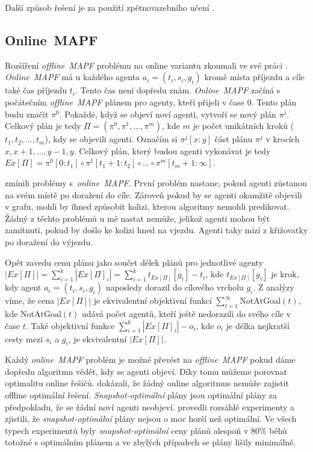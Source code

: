 Další způsob řešení je za použití zpětnovazebního učení \citep*{Zhiyao}.

\subsection{Online~MAPF}\label{subsec:online_mapf}

Rozšíření \emph{offline~MAPF} problému na online variantu zkoumali ve své práci \citet*{Svancara}.
\emph{Online~MAPF} má u každého agenta $a_i = (t_i, s_i, g_i)$ kromě místa příjezdu a cíle také čas příjezdu $t_i$.
Tento čas není dopředu znám.
\emph{Online~MAPF} začíná s počátečním \emph{offline~MAPF} plánem pro agenty, kteří přijeli v čase $0$.
Tento plán budu značit $\pi^0$.
Pokaždé, když se objeví noví agenti, vytvoří se nový plán $\pi^j$.
Celkový plán je tedy $\Pi = (\pi^0, \pi^1, \dots, \pi^m)$, kde $m$ je počet unikátních kroků ($t_1, t_2, \dots, t_m$), kdy se objevili agenti.
Označím si $\pi^j[x:y]$ část plánu $\pi^j$ v krocích $x, x + 1, \dots, y - 1, y$.
Celkový plán, který budou agenti vykonávat je tedy $Ex[\Pi] = \pi^0[0:t_1] \circ \pi^1[t_1 + 1:t_2] \circ \dots \circ \pi^m[t_m + 1:\infty]$.

\citet{Svancara} zmínili problémy s~\emph{online~MAPF}.
První problém nastane, pokud agenti zůstanou na svém místě po doražení do cíle.
Zároveň pokud by se agenti okamžitě objevili v grafu, mohli by ihned způsobit kolizi, kterou algoritmy nemohli predikovat.
Žádný z těchto problémů u mě nastat nemůže, jelikož agenti mohou být zamítnuti, pokud by došlo ke kolizi hned na vjezdu.
Agenti taky mizí z křižovatky po doražení do výjezdu.

Opět zavedu cenu plánu jako součet délek plánů pro jednotlivé agenty $|Ex[\Pi]| = \sum_{i=1}^{k} |Ex[\Pi]_i| = \sum_{i=1}^{k} t_{Ex[\Pi]}[g_i] - t_i$,
kde $t_{Ex[\Pi]}[g_i]$ je krok, kdy agent $a_i = (t_i, s_i, g_i)$ naposledy dorazil do cílového vrcholu $g_i$.
Z analýzy \citet{Svancara} víme, že cena $|Ex[\Pi]|$ je ekvivalentní objektivní funkci $\sum_{t=1}^{\infty} \textrm{NotAtGoal}(t)$,
kde $\textrm{NotAtGoal}(t)$ udává počet agentů, kteří ještě nedorazili do svého cíle v čase $t$.
Také objektivní funkce $\sum_{i=1}^{k} |Ex[\Pi]_i| - o_i$, kde $o_i$ je délka nejkratší cesty mezi $s_i$ a $g_i$,
je ekvivalentní $|Ex[\Pi]|$.

Každý \emph{online~MAPF} problém je možné převést na \emph{offline~MAPF} pokud dáme dopředu algoritmu vědět, kdy se agenti objeví.
Díky tomu můžeme porovnat optimalitu online řešičů.
\citet{Svancara} dokázali, že žádný online algoritmus nemůže zajistit offline optimální řešení.
\emph{Snapshot-optimální} plány jsou optimální plány za předpokladu, že se žádní noví agenti neobjeví.
\citet*{Morag} provedli rozsáhlé experimenty a zjistili, že \emph{snapshot-optimální} plány nejsou o moc horší než optimální.
Ve všech typech experimentů byly \emph{snapshot-optimální} ceny plánů alespoň v $80\%$ běhů totožné s optimálním plánem
a ve zbylých případech se plány lišily minimálně.

